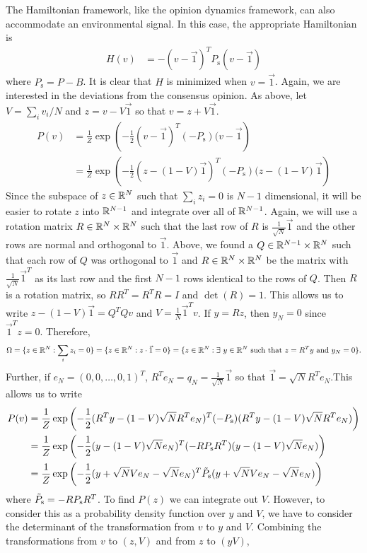 \documentclass{article}
\begin{document}
The Hamiltonian framework, like the opinion dynamics framework, can also accommodate an environmental signal. In this case, the appropriate Hamiltonian is 
\begin{equation}
\begin{array}{lll}
H(v)&=-(v-\vec{1})^TP_\text{s}(v-\vec{1})
\end{array}
\end{equation}
where $P_\text{s}=P-B$.
It is clear that $H$ is minimized when $v=\vec{1}$. 
Again, we are interested in the deviations from the consensus opinion. As above, let $V=\sum_iv_i/N$ and $z=v-V\vec{1}$ so that $v=z+V\vec{1}$. 
\begin{align*}
P(v)&=\frac{1}{Z}\exp\left(-\frac{1}{2}(v-\vec{1})^T(-P_\text{s})(v-\vec{1}\right)
\\&=\frac{1}{Z}\exp\left(-\frac{1}{2}(z-(1-V)\vec{1})^T(-P_\text{s})(z-(1-V)\vec{1}\right)
\end{align*}
Since the subspace of $z\in{\mathbb{R}}^N$ such that $\sum_iz_i=0$ is $N-1$ dimensional, it will be easier to rotate $z$ into ${\mathbb{R}}^{N-1}$ and integrate over all of ${\mathbb{R}}^{N-1}$.  Again, we will use a rotation matrix $R\in{\mathbb{R}}^N\times{\mathbb{R}}^N$ such that the last row of $R$ is $\frac{1}{\sqrt{N}}\vec{1}$ and the other rows are normal and orthogonal to $\vec{1}$.
Above, we found a $Q\in{\mathbb{R}}^{N-1}\times{\mathbb{R}}^N$ such that each row of $Q$ was orthogonal to $\vec{1}$ and $R\in{\mathbb{R}}^N\times{\mathbb{R}}^N$ be the matrix with $\frac{1}{\sqrt{N}}\vec{1}^T$ as its last row and the first $N-1$ rows identical to the rows of $Q$. Then $R$ is a rotation matrix, so $RR^T=R^TR=I$ and $\det(R)=1$. This allows us to write $z-(1-V)\vec{1}=Q^TQv$ and $V=\frac{1}{N}\vec{1}^Tv$. If $y=Rz$, then $y_N=0$ since $\vec{1}^Tz=0$. Therefore, 
$$\Omega=\{z\in{\mathbb{R}}^N:\sum_iz_i=0\}=\{z\in{\mathbb{R}}^N:z\cdot\vec{1}=0\}=\{z\in{\mathbb{R}}^N:\exists \ y\in{\mathbb{R}}^N \text{ such that } z=R^Ty \text{ and } y_N=0\}.$$
Further, if $e_N=(0,0,\dots,0,1)^T$, $R^Te_N=q_N=\frac{1}{\sqrt{N}}\vec{1}$ so that $\vec{1}=\sqrt{N}R^Te_N$.This allows us to write
\begin{align*}
P(v)&=\frac{1}{Z}\exp\left(-\frac{1}{2}(R^Ty-(1-V)\sqrt{N}R^Te_N)^T(-P_\text{s})(R^Ty-(1-V)\sqrt{N}R^Te_N)\right)
\\&=\frac{1}{Z}\exp\left(-\frac{1}{2}(y-(1-V)\sqrt{N}e_N)^T(-RP_\text{s}R^T)(y-(1-V)\sqrt{N}e_N)\right)
\\&=\frac{1}{Z}\exp\left(-\frac{1}{2}(y+\sqrt{N}Ve_N-\sqrt{N}e_N)^T\Tilde{P}_\text{s}(y+\sqrt{N}Ve_N-\sqrt{N}e_N)\right)
\end{align*}
where $\Tilde{P}_\text{s}=-RP_\text{s}R^T$. To find $P(z)$ we can integrate out $V$. However, to consider this as a probability density function over $y$ and $V$, we have to consider the determinant of the transformation from $v$ to $y$ and $V$.  Combining the transformations from $v$ to $(z,V)$ and from $z$ to $(yV)$,
\end{document}
